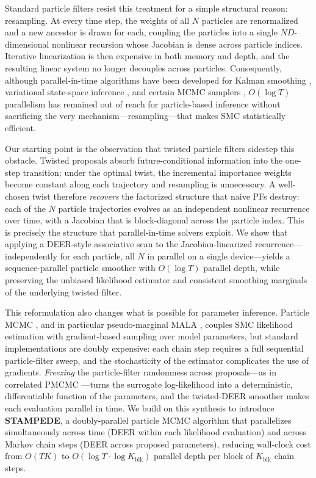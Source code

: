 \documentclass{article}
\begin{document}
Standard particle filters resist this treatment for a simple structural reason: resampling. At every time step, the weights of all $N$ particles are renormalized and a new ancestor is drawn for each, coupling the particles into a single $ND$-dimensional nonlinear recursion whose Jacobian is dense across particle indices. Iterative linearization is then expensive in both memory and depth, and the resulting linear system no longer decouples across particles. Consequently, although parallel-in-time algorithms have been developed for Kalman smoothing \citep{sarkka2021temporal}, variational state-space inference \citep{hassan2022parallel}, and certain MCMC samplers \citep{gonzalez2024towards}, $O(\log T)$ parallelism has remained out of reach for particle-based inference without sacrificing the very mechanism---resampling---that makes SMC statistically efficient.

Our starting point is the observation that twisted particle filters \citep{whiteley2014twisted,guarniero2017iterated,heng2020controlled} sidestep this obstacle. Twisted proposals absorb future-conditional information into the one-step transition; under the optimal twist, the incremental importance weights become constant along each trajectory and resampling is unnecessary. A well-chosen twist therefore \emph{recovers} the factorized structure that naive PFs destroy: each of the $N$ particle trajectories evolves as an independent nonlinear recurrence over time, with a Jacobian that is block-diagonal across the particle index. This is precisely the structure that parallel-in-time solvers exploit. We show that applying a DEER-style associative scan to the Jacobian-linearized recurrence---independently for each particle, all $N$ in parallel on a single device---yields a sequence-parallel particle smoother with $O(\log T)$ parallel depth, while preserving the unbiased likelihood estimator and consistent smoothing marginals of the underlying twisted filter.

This reformulation also changes what is possible for parameter inference. Particle MCMC \citep{andrieu2010particle}, and in particular pseudo-marginal MALA \citep{nemeth2016particle}, couples SMC likelihood estimation with gradient-based sampling over model parameters, but standard implementations are doubly expensive: each chain step requires a full sequential particle-filter sweep, and the stochasticity of the estimator complicates the use of gradients. \emph{Freezing} the particle-filter randomness across proposals---as in correlated PMCMC \citep{deligiannidis2018correlated}---turns the surrogate log-likelihood into a deterministic, differentiable function of the parameters, and the twisted-DEER smoother makes each evaluation parallel in time. We build on this synthesis to introduce \textbf{STAMPEDE}, a doubly-parallel particle MCMC algorithm that parallelizes simultaneously across time (DEER within each likelihood evaluation) and across Markov chain steps (DEER across proposed parameters), reducing wall-clock cost from $O(TK)$ to $O(\log T \cdot \log K_{\mathrm{blk}})$ parallel depth per block of $K_{\mathrm{blk}}$ chain steps.
\end{document}
